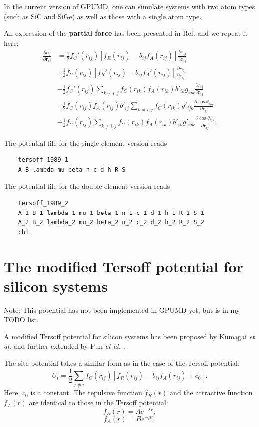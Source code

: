 \documentclass[12pt,a4paper]{report}
\newcommand{\vect}[1]{\boldsymbol{#1}}
\begin{document}
In the current version of GPUMD, one can simulate systems with two atom types (such as SiC and SiGe) as well as those with a single atom type.

An expression of the \textbf{partial force} has been presented in Ref. \cite{fan2015prb} and we repeat it here:
\begin{align}
\frac{\partial U_i}{\partial \vect{r}_{ij}}
&= \frac{1}{2}f_C'(r_{ij})[f_R(r_{ij})-b_{ij}f_A(r_{ij})]\frac{\partial r_{ij}}{\partial \vect{r}_{ij}} \nonumber \\
&+ \frac{1}{2}f_C(r_{ij})[f_R'(r_{ij})-b_{ij}f_A'(r_{ij})]\frac{\partial r_{ij}}{\partial \vect{r}_{ij}} \nonumber \\
&- \frac{1}{2}f_C'(r_{ij})\sum_{k\neq i,j}f_C(r_{ik})f_A(r_{ik})b'_{ik}g_{ijk} \frac{\partial r_{ij}}{\partial \vect{r}_{ij}} \nonumber \\
&- \frac{1}{2}f_C(r_{ij})f_A(r_{ij})b'_{ij}\sum_{k\neq i,j}f_C(r_{ik})  g'_{ijk}
   \frac{\partial \cos\theta_{ijk}}{\partial \vect{r}_{ij}} \nonumber \\
&- \frac{1}{2}f_C(r_{ij})\sum_{k\neq i,j}f_C(r_{ik})f_A(r_{ik})b'_{ik}  g'_{ijk}
   \frac{\partial \cos\theta_{ijk}}{\partial \vect{r}_{ij}}.
\end{align}


The potential file for the single-element version reads
\begin{verbatim}
    tersoff_1989_1
    A B lambda mu beta n c d h R S
\end{verbatim}
The potential file for the double-element version reads
\begin{verbatim}
    tersoff_1989_2
    A_1 B_1 lambda_1 mu_1 beta_1 n_1 c_1 d_1 h_1 R_1 S_1
    A_2 B_2 lambda_2 mu_2 beta_2 n_2 c_2 d_2 h_2 R_2 S_2
    chi
\end{verbatim}


\section{The modified Tersoff potential for silicon systems}

Note: This potential has not been implemented in GPUMD yet, but is in my TODO list.

A modified Tersoff potential for silicon systems has been proposed by Kumagai \textit{et al.} \cite{kumagai2007cms} and further extended by Pun \textit{et al.} \cite{pun2017prb}.

The site potential takes a similar form as in the case of the Tersoff potential:
\begin{equation}
U_i =  \frac{1}{2} \sum_{j \neq i} f_C(r_{ij}) \left[ f_R(r_{ij}) - b_{ij} f_A(r_{ij}) + c_0\right].
\end{equation}
Here, $c_0$ is a constant. The repulsive function $f_{R}(r)$ and the attractive function $f_{A}(r)$ are identical to those in the Tersoff potential:
\begin{equation}
f_{R}(r) = A e^{-\lambda r};
\end{equation}
\begin{equation}
f_{A}(r) = B e^{-\mu r}.
\end{equation}
\end{document}
